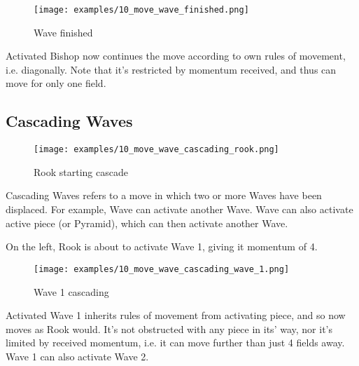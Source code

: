 \clearpage %

\noindent
\begin{figure}[h]
\texttt{[image: examples/10\_move\_wave\_finished.png]}
\caption{Wave finished}
\label{fig:10_move_wave_finished}
\end{figure}

Activated Bishop now continues the move according to own rules of movement,
i.e. diagonally. Note that it's restricted by momentum received, and thus
can move for only one field.

\clearpage %

\subsection*{Cascading Waves}

\noindent
\begin{wrapfigure}[13]{l}{0.5625\textwidth}
\texttt{[image: examples/10\_move\_wave\_cascading\_rook.png]}
\caption{Rook starting cascade}
\label{fig:10_move_wave_cascading_rook}
\end{wrapfigure}
Cascading Waves refers to a move in which two or more Waves have been displaced.
For example, Wave can activate another Wave. Wave can also activate active
piece (or Pyramid), which can then activate another Wave.

On the left, Rook is about to activate Wave 1, giving it momentum of 4.

\vspace*{0.05\textheight}
\noindent
\begin{wrapfigure}[12]{r}{0.5625\textwidth}
\texttt{[image: examples/10\_move\_wave\_cascading\_wave\_1.png]}
\caption{Wave 1 cascading}
\label{fig:10_move_wave_cascading_wave_1}
\end{wrapfigure}
Activated Wave 1 inherits rules of movement from activating piece, and so now
moves as Rook would. It's not obstructed with any piece in its' way, nor it's
limited by received momentum, i.e. it can move further than just 4 fields away.
Wave 1 can also activate Wave 2.

\clearpage %

